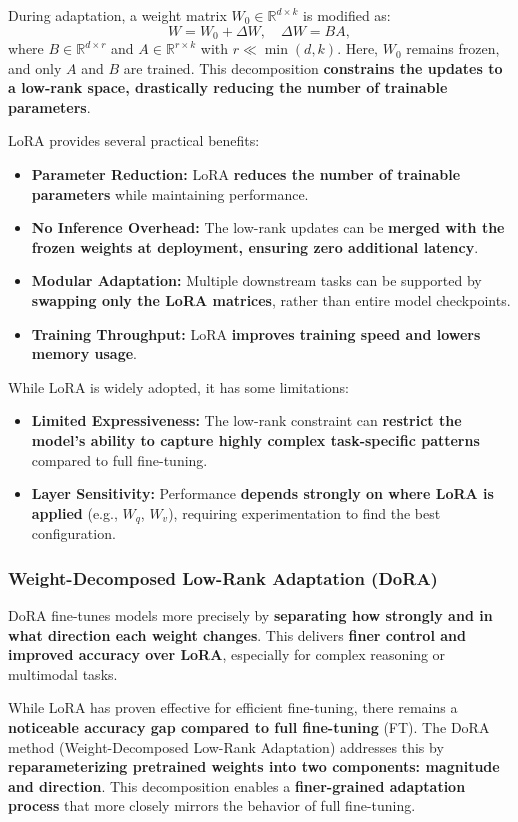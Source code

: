 \documentclass[11pt,a4paper]{article}
\begin{document}
During adaptation, a weight matrix $W_0 \in \mathbb{R}^{d \times k}$ is modified as:
\[
W = W_0 + \Delta W, \quad \Delta W = BA,
\]
where $B \in \mathbb{R}^{d \times r}$ and $A \in \mathbb{R}^{r \times k}$ with $r \ll \min(d,k)$.  
Here, $W_0$ remains frozen, and only $A$ and $B$ are trained. This decomposition \textbf{constrains the updates to a low-rank space, drastically reducing the number of trainable parameters}.

LoRA provides several practical benefits:
\begin{itemize}[leftmargin=1.5em]
    \item \textbf{Parameter Reduction:} LoRA \textbf{reduces the number of trainable parameters} while maintaining performance.
    \item \textbf{No Inference Overhead:} The low-rank updates can be \textbf{merged with the frozen weights at deployment, ensuring zero additional latency}.
    \item \textbf{Modular Adaptation:} Multiple downstream tasks can be supported by \textbf{swapping only the LoRA matrices}, rather than entire model checkpoints.
    \item \textbf{Training Throughput:} LoRA \textbf{improves training speed and lowers memory usage}.
\end{itemize}

While LoRA is widely adopted, it has some limitations:
\begin{itemize}[leftmargin=1.5em]
    \item \textbf{Limited Expressiveness:} The low-rank constraint can \textbf{restrict the model's ability to capture highly complex task-specific patterns} compared to full fine-tuning.
    \item \textbf{Layer Sensitivity:} Performance \textbf{depends strongly on where LoRA is applied} (e.g., $W_q$, $W_v$), requiring experimentation to find the best configuration.
\end{itemize}

\subsubsection{Weight-Decomposed Low-Rank Adaptation (DoRA)}
DoRA fine-tunes models more precisely by \textbf{separating how strongly and in what direction each weight changes}.
This delivers \textbf{finer control and improved accuracy over LoRA}, especially for complex reasoning or multimodal tasks.

While LoRA has proven effective for efficient fine-tuning, there remains a \textbf{noticeable accuracy gap compared to full fine-tuning} (FT). 
The DoRA method \cite{liu2024dora} (Weight-Decomposed Low-Rank Adaptation) addresses this by \textbf{reparameterizing pretrained weights into two components: magnitude and direction}. 
This decomposition enables a \textbf{finer-grained adaptation process} that more closely mirrors the behavior of full fine-tuning.
\end{document}

